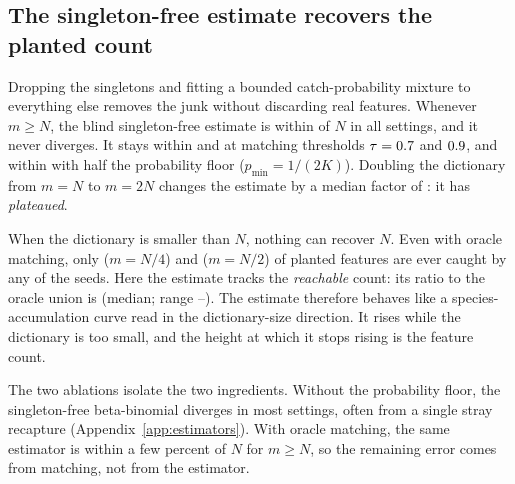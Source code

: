 \subsection{The singleton-free estimate recovers the planted count}
\label{sec:sf}
Dropping the singletons and fitting a bounded catch-probability mixture to everything else removes the junk without discarding real features. Whenever $m\ge N$, the blind singleton-free estimate is within \SfMaxErrComplete{} of $N$ in all \NComplete{} settings, and it never diverges. It stays within \SfMaxErrCompleteTauLo{} and \SfMaxErrCompleteTauHi{} at matching thresholds $\tau=0.7$ and $0.9$, and within \SfMaxErrCompleteHalfPmin{} with half the probability floor ($p_{\min}=1/(2K)$). Doubling the dictionary from $m=N$ to $m=2N$ changes the estimate by a median factor of \PlateauMed{}: it has \emph{plateaued}.

When the dictionary is smaller than $N$, nothing can recover $N$. Even with oracle matching, only \OracleUnionQuarter{} ($m=N/4$) and \OracleUnionHalf{} ($m=N/2$) of planted features are ever caught by any of the \SynSeeds{} seeds. Here the estimate tracks the \emph{reachable} count: its ratio to the oracle union is \SfReachMed{} (median; range \SfReachLo--\SfReachHi). The estimate therefore behaves like a species-accumulation curve read in the dictionary-size direction. It rises while the dictionary is too small, and the height at which it stops rising is the feature count.

The two ablations isolate the two ingredients. Without the probability floor, the singleton-free beta-binomial diverges in most settings, often from a single stray recapture (Appendix~\ref{app:estimators}). With oracle matching, the same estimator is within a few percent of $N$ for $m\ge N$, so the remaining error comes from matching, not from the estimator.

